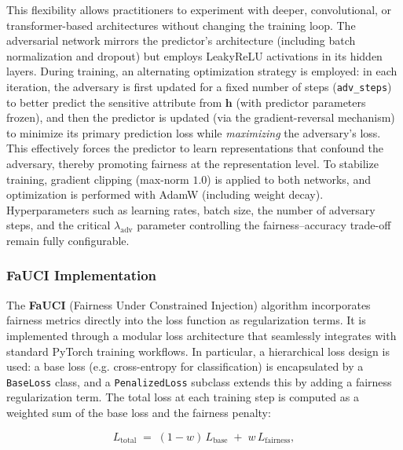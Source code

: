 \documentclass[12pt,a4paper,openright,twoside]{book}
\begin{document}
This flexibility allows practitioners to experiment with deeper, convolutional, or transformer-based architectures without changing the training loop.  The adversarial network mirrors the predictor's architecture (including batch normalization and dropout) but employs LeakyReLU activations in its hidden layers.  During training, an alternating optimization strategy is employed: in each iteration, the adversary is first updated for a fixed number of steps (\texttt{adv\_steps}) to better predict the sensitive attribute from $\mathbf{h}$ (with predictor parameters frozen), and then the predictor is updated (via the gradient-reversal mechanism) to minimize its primary prediction loss while \emph{maximizing} the adversary’s loss.  This effectively forces the predictor to learn representations that confound the adversary, thereby promoting fairness at the representation level.  To stabilize training, gradient clipping (max-norm $1.0$) is applied to both networks, and optimization is performed with AdamW (including weight decay).  Hyperparameters such as learning rates, batch size, the number of adversary steps, and the critical $\lambda_{\text{adv}}$ parameter controlling the fairness–accuracy trade-off remain fully configurable.

\subsubsection{FaUCI Implementation}
The \textbf{FaUCI} (Fairness Under Constrained Injection) algorithm incorporates fairness metrics directly into the loss function as regularization terms. It is implemented through a modular loss architecture that seamlessly integrates with standard PyTorch training workflows. In particular, a hierarchical loss design is used: a base loss (e.g. cross-entropy for classification) is encapsulated by a \texttt{BaseLoss} class, and a \texttt{PenalizedLoss} subclass extends this by adding a fairness regularization term. The total loss at each training step is computed as a weighted sum of the base loss and the fairness penalty:

\begin{equation}
    L_{\text{total}} \;=\; (1 - w)\,L_{\text{base}} \;+\; w\,L_{\text{fairness}},
\end{equation}
\end{document}
